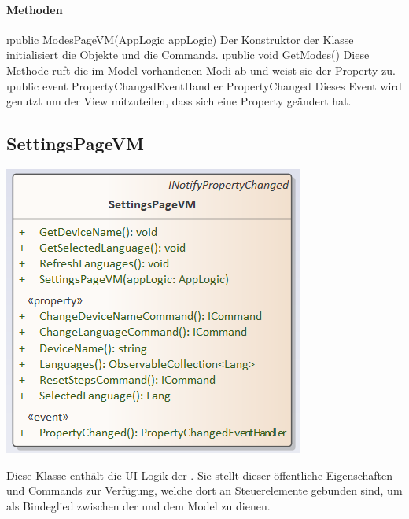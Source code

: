 \documentclass[../entwurf.tex]{subfiles}
\begin{document}
\paragraph{Methoden}
\begin{itemize}
	\i{public ModesPageVM(AppLogic appLogic)} Der Konstruktor der Klasse initialisiert die Objekte  und die Commands.
	\i{public void GetModes()} Diese Methode ruft die im Model vorhandenen Modi ab und weist sie der Property  zu.
	\i{public event PropertyChangedEventHandler PropertyChanged} Dieses Event wird genutzt um der View mitzuteilen, dass sich eine Property geändert hat.
\end{itemize}
\subsection{SettingsPageVM}
\begin{minipage}{0.55\textwidth}
\includegraphics[scale=0.75]{../graphics/vm_klassen/SettingsPageVM.png}
\end{minipage}
\begin{minipage}{0.45\textwidth}
Diese Klasse enthält die UI-Logik der . Sie stellt dieser öffentliche Eigenschaften und Commands zur Verfügung, welche dort an Steuerelemente gebunden sind, um als Bindeglied zwischen der  und dem Model zu dienen.
\end{minipage}
\end{document}
